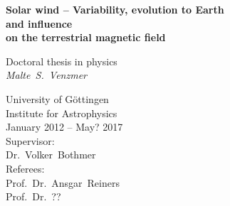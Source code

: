 \begin{titlepage}
	\begin{center}
	
	
		\vspace*{10mm}
		\Large

		\textbf{Solar wind -- Variability, evolution to Earth\\and influence\\on the terrestrial magnetic field}
		
		\vspace{15mm}
		\large
		Doctoral thesis in physics\\
		\vspace{15mm}
		\textit{Malte~S.~Venzmer}\\
		\vspace{10mm}
		
		
		\vspace{10mm}

		University of Göttingen\\
		\vspace{5mm}
		Institute for Astrophysics\\
		\vspace{5mm}
		January 2012 -- May? 2017\\
		\vspace{15mm}
		Supervisor:\\
		Dr.~Volker~Bothmer\\
		\vspace{5mm}
		Referees:\\
		Prof.~Dr.~Ansgar~Reiners\\
		Prof.~Dr.~??\\
		
		
	\end{center}
\end{titlepage}

